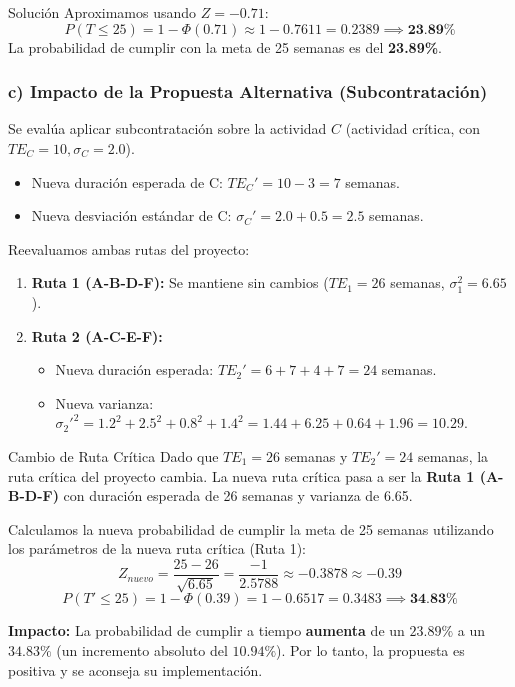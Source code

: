 \documentclass[11pt, a4paper]{article}
\begin{document}
\begin{ejercicio}{Solución}
  Aproximamos usando $Z = -0.71$:
  \begin{equation*}
    P(T \le 25) = 1 - \Phi(0.71) \approx 1 - 0.7611 = 0.2389 \implies \textbf{23.89\%}
  \end{equation*}
  La probabilidad de cumplir con la meta de 25 semanas es del \textbf{23.89\%}.

  \subsubsection*{c) Impacto de la Propuesta Alternativa (Subcontratación)}
  Se evalúa aplicar subcontratación sobre la actividad $C$ (actividad crítica, con $TE_C=10, \sigma_C=2.0$).
  \begin{itemize}
    \item Nueva duración esperada de C: $TE_C' = 10 - 3 = 7$ semanas.
    \item Nueva desviación estándar de C: $\sigma_C' = 2.0 + 0.5 = 2.5$ semanas.
  \end{itemize}

  Reevaluamos ambas rutas del proyecto:
  \begin{enumerate}
    \item \textbf{Ruta 1 (A-B-D-F):} Se mantiene sin cambios ($TE_1 = 26$ semanas, $\sigma_1^2 = 6.65$).
    \item \textbf{Ruta 2 (A-C-E-F):}
    \begin{itemize}
      \item Nueva duración esperada: $TE_2' = 6 + 7 + 4 + 7 = 24$ semanas.
      \item Nueva varianza: $\sigma_2'^2 = 1.2^2 + 2.5^2 + 0.8^2 + 1.4^2 = 1.44 + 6.25 + 0.64 + 1.96 = 10.29$.
    \end{itemize}
  \end{enumerate}

  \begin{trampa}{Cambio de Ruta Crítica}
    Dado que $TE_1 = 26$ semanas y $TE_2' = 24$ semanas, la ruta crítica del proyecto cambia. La nueva ruta crítica pasa a ser la \textbf{Ruta 1 (A-B-D-F)} con duración esperada de 26 semanas y varianza de 6.65.
  \end{trampa}

  Calculamos la nueva probabilidad de cumplir la meta de 25 semanas utilizando los parámetros de la nueva ruta crítica (Ruta 1):
  \begin{equation*}
    Z_{nuevo} = \frac{25 - 26}{\sqrt{6.65}} = \frac{-1}{2.5788} \approx -0.3878 \approx -0.39
  \end{equation*}
  \begin{equation*}
    P(T' \le 25) = 1 - \Phi(0.39) = 1 - 0.6517 = 0.3483 \implies \textbf{34.83\%}
  \end{equation*}

  \textbf{Impacto:} La probabilidad de cumplir a tiempo \textbf{aumenta} de un $23.89\%$ a un $34.83\%$ (un incremento absoluto del $10.94\%$). Por lo tanto, la propuesta es positiva y se aconseja su implementación.

\end{ejercicio}

\newpage


\newpage
\end{document}
